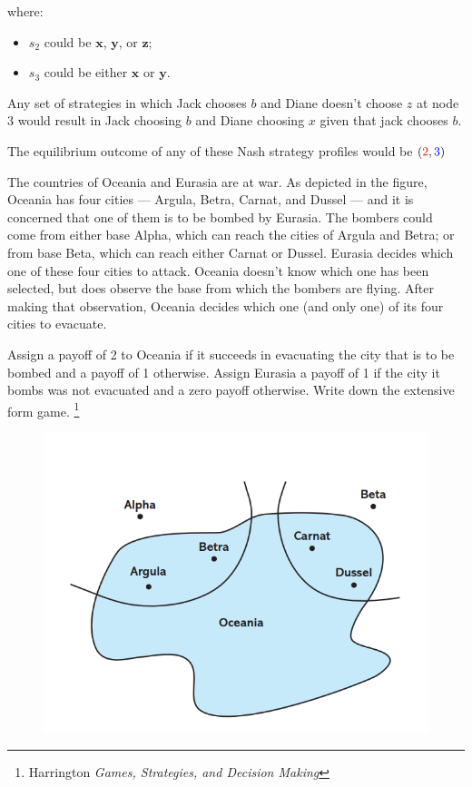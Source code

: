 \documentclass[addpoints ]{exam}
\begin{document}
\begin{questions}
\begin{solution}
\begin{parts}
\begin{itemize}
      where:
      \begin{itemize}
          \item $s_2$ could be $\mathbf{x}$, $\mathbf{y}$, or $\mathbf{z}$; 
          \item $s_3$ could be either $\mathbf{x}$ or $\mathbf{y}$.
      \end{itemize}

      Any set of strategies in which Jack chooses $b$ 
      and Diane doesn't choose $z$ at node $3$ 
      would result in Jack choosing $b$ 
      and Diane choosing $x$ given that jack chooses $b$. 

      The equilibrium outcome of any of these Nash strategy profiles
      would be $({\color{red} 2}, {\color{blue} 3})$

    \end{itemize}

  \end{parts}

\begin{center}
  
\end{center}

\end{solution}

\newpage



\question[10] 
The countries of Oceania and Eurasia are at war.
As depicted in the figure, Oceania has four cities —
Argula, Betra, Carnat, and Dussel — 
and it is concerned that one of them is to be bombed by Eurasia.
The bombers could come from either base Alpha,
which can reach the cities of Argula and Betra;
or from base Beta, which can reach either Carnat or Dussel.
Eurasia decides which one of these four cities to attack.
Oceania doesn’t know which one has been selected,
but does observe the base from which the bombers are flying.
After making that observation, Oceania decides which one 
(and only one) of its four cities to evacuate.

Assign a payoff of 2 to Oceania
if it succeeds in evacuating the city that is to be bombed
and a payoff of 1 otherwise.
Assign Eurasia a payoff of 1 if the city it bombs was not evacuated
and a zero payoff otherwise.
Write down the extensive form game.
\footnote{Harrington \textit{Games, Strategies, and Decision Making}}

\begin{figure}[!h]
  \centering
  \includegraphics[width=.4\linewidth]{figures/figPR2.1.png} 
\end{figure}


\end{questions}
\end{document}
